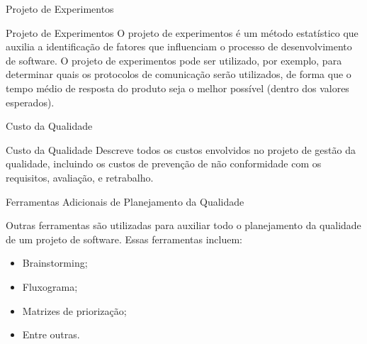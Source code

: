 \documentclass[xcolor=x11names,compress]{beamer}
\begin{document}
\begin{frame}{Projeto de Experimentos}

\begin{alertblock}{Projeto de Experimentos}
O projeto de experimentos é um método estatístico que auxilia a identificação de fatores que influenciam o processo de desenvolvimento de software. O projeto de experimentos pode ser utilizado, por exemplo, para determinar quais os protocolos de comunicação serão utilizados, de forma que o tempo médio de resposta do produto seja o melhor possível (dentro dos valores esperados).
\end{alertblock}

\end{frame}

\begin{frame}{Custo da Qualidade}

\begin{alertblock}{Custo da Qualidade}
Descreve todos os custos envolvidos no projeto de gestão da qualidade, incluindo  os custos de prevenção de não conformidade com os requisitos, avaliação, e retrabalho. 
\end{alertblock}

\end{frame}

\begin{frame}{Ferramentas Adicionais de Planejamento da Qualidade}

Outras ferramentas são utilizadas para auxiliar todo o planejamento da qualidade de um projeto de software. Essas ferramentas incluem:

\begin{itemize}
\itemsep 3mm

\item Brainstorming;

\item Fluxograma;

\item Matrizes de priorização;

\item Entre outras.

\end{itemize}

\end{frame}
\end{document}
